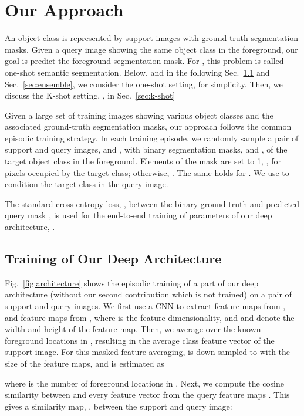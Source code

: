 \documentclass[10pt,twocolumn,letterpaper]{article}
\begin{document}
\section{Our Approach}
\label{sec:method}

An object class is represented by  support images with  ground-truth segmentation masks. Given a query image showing the same object class in the foreground, our goal is predict the foreground segmentation mask. For , this problem is called one-shot semantic segmentation. Below, and in the following Sec.~\ref{sec:training} and Sec.~\ref{sec:ensemble}, we consider the one-shot setting, for simplicity. Then, we discuss the K-shot setting, , in Sec.~\ref{sec:k-shot}

Given a large set of training images showing various object classes and the associated ground-truth segmentation masks, our approach follows the common episodic training strategy. In each training episode, we randomly sample a pair of support and query images,  and , with binary segmentation masks,  and , of the target object class in the foreground. Elements of the mask are set to 1,  , for pixels  occupied by the target class; otherwise, . The same holds for . We use  to condition the target class  in the query image. 

The standard cross-entropy loss, , between the binary ground-truth  and predicted query mask , is used for the end-to-end training of parameters  of our deep architecture, .


\subsection{Training of Our Deep Architecture}\label{sec:training}
Fig.~\ref{fig:architecture} shows the episodic training of a part of our deep architecture (without our second contribution which is not trained) on a pair of support  and query  images. We first use a CNN to extract feature maps  from , and feature maps  from , where  is the feature dimensionality, and  and  denote the width and height of the feature map. Then, we average  over the known foreground locations in , resulting in the average class feature vector  of the support image. For this masked feature averaging,  is down-sampled to  with the size  of the feature maps, and  is estimated as

where  is the number of  foreground locations in .
Next, we compute the cosine similarity between   and every feature vector  from the query feature maps . This gives a similarity map,  , between the support and query image:
\end{document}
